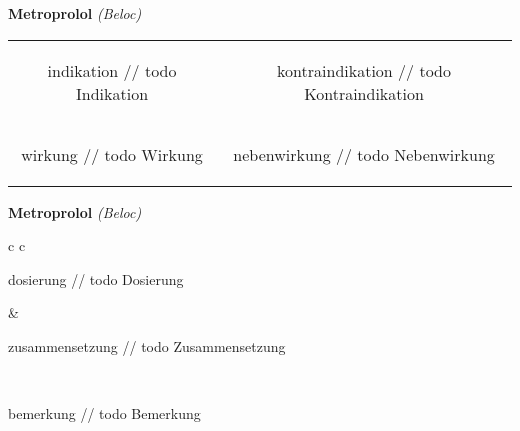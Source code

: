 \documentclass[12pt]{beamer}
\begin{document}
\begin{frame}{
    \textbf{Metroprolol}
    \textit{(Beloc)}
}
    \begin{tabular}{c c}
        \begin{beamercolorbox}[wd=\boxwidth\textwidth,ht=\boxheight\textheight,sep=1em]{indikation}
        // todo Indikation
        \end{beamercolorbox} & 
        \begin{beamercolorbox}[wd=\boxwidth\textwidth,ht=\boxheight\textheight,sep=1em]{kontraindikation}
        // todo Kontraindikation 
        \end{beamercolorbox} \\
        \begin{beamercolorbox}[wd=\boxwidth\textwidth,ht=\boxheight\textheight,sep=1em]{wirkung}
        // todo Wirkung
        \end{beamercolorbox} & 
        \begin{beamercolorbox}[wd=\boxwidth\textwidth,ht=\boxheight\textheight,sep=1em]{nebenwirkung}
        // todo Nebenwirkung
        \end{beamercolorbox} \\
    \end{tabular}
\end{frame}

\begin{frame}{
    \textbf{Metroprolol}
    \textit{(Beloc)}
}
    \begin{tabular}{c c}
        \begin{beamercolorbox}[wd=\boxwidth\textwidth,ht=\boxheight\textheight,sep=1em]{dosierung}
        // todo Dosierung
        \end{beamercolorbox} & 
        \begin{beamercolorbox}[wd=\boxwidth\textwidth,ht=\boxheight\textheight,sep=1em]{zusammensetzung}
        // todo Zusammensetzung
        \end{beamercolorbox} \\
        \begin{beamercolorbox}[wd=\textwidth,ht=\boxheight\textheight,sep=1em]{bemerkung}
        // todo Bemerkung
        \end{beamercolorbox} \\
    \end{tabular}
\end{frame}
\end{document}
